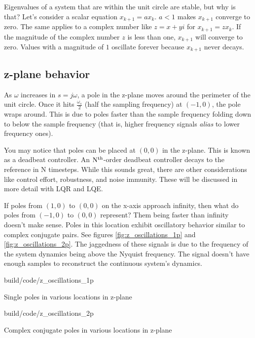 Eigenvalues of a \gls{system} that are within the unit circle are stable, but
why is that? Let's consider a scalar equation $x_{k + 1} = ax_k$. $a < 1$ makes
$x_{k + 1}$ converge to zero. The same applies to a complex number like
$z = x + yi$ for $x_{k + 1} = zx_k$. If the magnitude of the complex number $z$
is less than one, $x_{k+1}$ will converge to zero. Values with a magnitude of
$1$ oscillate forever because $x_{k+1}$ never decays.

\subsection{z-plane behavior}

As $\omega$ increases in $s = j\omega$, a pole in the z-plane moves around the
perimeter of the unit circle. Once it hits $\frac{\omega_s}{2}$ (half the
sampling frequency) at $(-1, 0)$, the pole wraps around. This is due to poles
faster than the sample frequency folding down to below the sample frequency
(that is, higher frequency signals \textit{alias} to lower frequency ones).

You may notice that poles can be placed at $(0, 0)$ in the z-plane. This is
known as a deadbeat controller. An $\rm N^{th}$-order deadbeat controller decays
to the \gls{reference} in N timesteps. While this sounds great, there are other
considerations like \gls{control effort}, \gls{robustness}, and
\gls{noise immunity}. These will be discussed in more detail with LQR and LQE.

If poles from $(1, 0)$ to $(0, 0)$ on the x-axis approach infinity, then what do
poles from $(-1, 0)$ to $(0, 0)$ represent? Them being faster than infinity
doesn't make sense. Poles in this location exhibit oscillatory behavior similar
to complex conjugate pairs. See figures \ref{fig:z_oscillations_1p} and
\ref{fig:z_oscillations_2p}. The jaggedness of these signals is due to the
frequency of the \gls{system} dynamics being above the Nyquist frequency. The
 signal doesn't have enough samples to
reconstruct the continuous \gls{system}'s dynamics.

\begin{bookfigure}
  \begin{minisvg}{build/code/z_oscillations_1p}
    \caption{Single poles in various locations in z-plane}
    \label{fig:z_oscillations_1p}
  \end{minisvg}
  \hfill
  \begin{minisvg}{build/code/z_oscillations_2p}
    \caption{Complex conjugate poles in various locations in z-plane}
    \label{fig:z_oscillations_2p}
  \end{minisvg}
\end{bookfigure}

